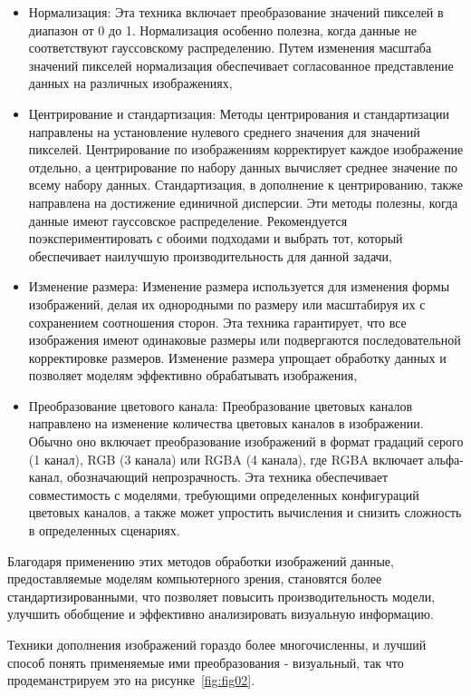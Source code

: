 \begin{itemize}
\item Нормализация: Эта техника включает преобразование значений пикселей в диапазон от 0 до 1. Нормализация особенно полезна, когда данные не соответствуют гауссовскому распределению. Путем изменения масштаба значений пикселей нормализация обеспечивает согласованное представление данных на различных изображениях,
\item Центрирование и стандартизация: Методы центрирования и стандартизации направлены на установление нулевого среднего значения для значений пикселей. Центрирование по изображениям корректирует каждое изображение отдельно, а центрирование по набору данных вычисляет среднее значение по всему набору данных. Стандартизация, в дополнение к центрированию, также направлена на достижение единичной дисперсии. Эти методы полезны, когда данные имеют гауссовское распределение. Рекомендуется поэкспериментировать с обоими подходами и выбрать тот, который обеспечивает наилучшую производительность для данной задачи,
\item Изменение размера: Изменение размера используется для изменения формы изображений, делая их однородными по размеру или масштабируя их с сохранением соотношения сторон. Эта техника гарантирует, что все изображения имеют одинаковые размеры или подвергаются последовательной корректировке размеров. Изменение размера упрощает обработку данных и позволяет моделям эффективно обрабатывать изображения,
\item Преобразование цветового канала: Преобразование цветовых каналов направлено на изменение количества цветовых каналов в изображении. Обычно оно включает преобразование изображений в формат градаций серого (1 канал), RGB (3 канала) или RGBA (4 канала), где RGBA включает альфа-канал, обозначающий непрозрачность. Эта техника обеспечивает совместимость с моделями, требующими определенных конфигураций цветовых каналов, а также может упростить вычисления и снизить сложность в определенных сценариях.
\end{itemize}

Благодаря применению этих методов обработки изображений данные, предоставляемые моделям компьютерного зрения, становятся более стандартизированными, что позволяет повысить производительность модели, улучшить обобщение и эффективно анализировать визуальную информацию.

Техники дополнения изображений гораздо более многочисленны, и лучший способ понять применяемые ими преобразования - визуальный, так что продеманстрируем это на рисунке~\ref{fig:fig02}.

